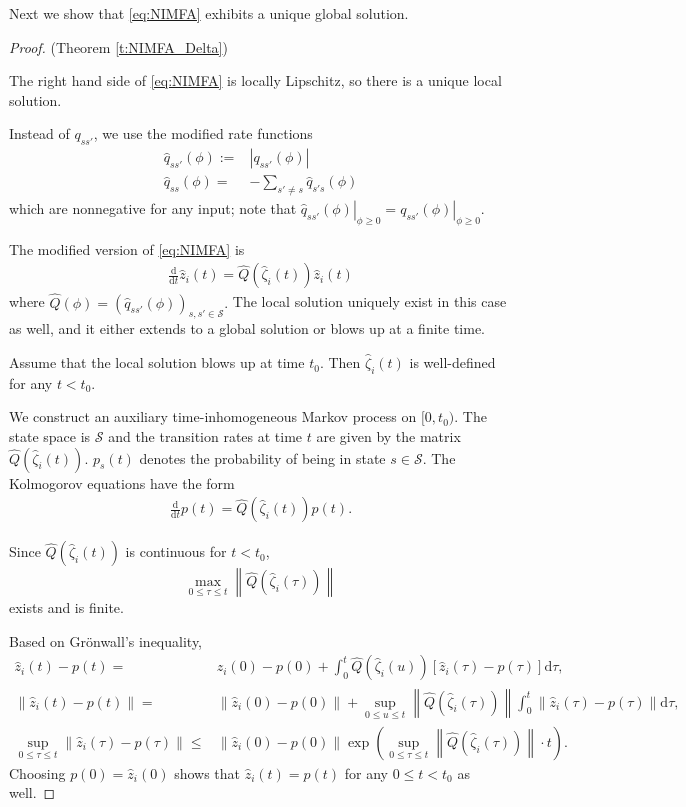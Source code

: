 \documentclass{article}
\renewcommand{\d}{\mathrm{d}}
\newcommand{\1}[1]{{\mathds{1}}_{\left\{#1\right\}}}
\renewcommand{\S}{\mathcal{S}}
\begin{document}
	Next we show that \eqref{eq:NIMFA} exhibits a unique global solution.
	\begin{proof}(Theorem \ref{t:NIMFA_Delta})
		
		The right hand side of \eqref{eq:NIMFA} is locally Lipschitz, so there is a unique local solution.
		
		Instead of $q_{ss'}$, we use the modified rate functions	
		\begin{align}
			\label{eq:q_hat}
			\hat{q}_{ss'}(\phi):=& \left|q_{ss'}(\phi) \right|\\
			\nonumber
			\hat{q}_{ss}(\phi)=&-\sum_{s' \neq s}\hat{q}_{s's}(\phi)
		\end{align}	
		which are nonnegative for any input; note that $\left. \hat{q}_{ss'}(\phi) \right|_{\phi \geq 0} =\left. q_{ss'}(\phi) \right|_{\phi \geq 0}.$
		
		The modified version of \eqref{eq:NIMFA} is
		\begin{align*}
			\frac{\d}{\d t} \hat{z}_{i}(t)=\hat{Q} \left( \hat{\zeta}_{i}(t) \right)\hat{z}_i(t)
		\end{align*}
		where $\hat{Q}(\phi)=\left(\hat{q}_{ss'}(\phi) \right)_{s,s' \in \S}.$ The local solution uniquely exist in this case as well, and it either extends to a global solution or blows up at a finite time.
		
		Assume that the local solution blows up at time $t_0$. Then $\hat{\zeta}_{i}(t)$ is well-defined for any $t<t_0.$ 
		
		We construct an auxiliary time-inhomogeneous Markov process on $[0,t_0)$. The state space is $\S$ and the transition  rates at time $t$ are given by the matrix  $\hat{Q}\left( \hat{\zeta}_{i}(t)\right)$.  $p_s(t)$ denotes the probability of being in state $s \in \S.$ The Kolmogorov equations have the form
		\begin{align*}
			\frac{\d }{\d t} p(t)=\hat{Q}\left( \hat{\zeta}_i(t)\right)p(t).
		\end{align*}
		
		Since $\hat{Q} \left(\hat{\zeta}_i(t)\right)$ is continuous for $t<t_0$,
		$$\max_{0 \leq \tau \le t} \left \| \hat{Q} \left(\hat{\zeta}_i(\tau)\right) \right \|$$ exists and is finite.
		
		Based on Grönwall's inequality,
		\begin{align*}
			\hat{z}_{i}(t)-p(t)=& \hat{z}_{i}(0)-p(0) + \int_{0}^{t} \hat{Q}\left( \hat{\zeta}_i(u) \right) \left[\hat{z}_{i}(\tau)-p(\tau) \right]  \d \tau, \\
			\left \|\hat{z}_{i}(t)-p(t)\right \|=& \left \|\hat{z}_{i}(0)-p(0)\right \| +\sup_{0 \leq u \leq t} \left \|\hat{Q}\left( \hat{\zeta}_i(\tau) \right) \right\| \int_{0}^{t} \left \| \hat{z}_{i}(\tau)-p(\tau) \right \|  \d \tau, \\
			\sup_{0 \leq \tau \leq t}	\left \|\hat{z}_{i}(\tau)-p(\tau)\right \| \leq& \left \|\hat{z}_{i}(0)-p(0)\right \| \exp \left(\sup_{0 \leq \tau \leq t} \left \|\hat{Q}\left( \hat{\zeta}_i(\tau) \right) \right\| \cdot t\right).
		\end{align*}
		Choosing $p(0)=\hat{z}_i(0)$ shows that $\hat{z}_{i}(t)=p(t)$ for any $0 \leq t <t_0$ as well.
		

\end{proof}
\end{document}
